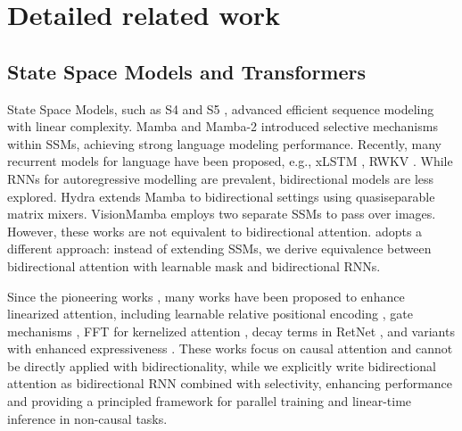 \section{Detailed related work}
\label{sec:detailrelatedwork}

\subsection{State Space Models and Transformers}

State Space Models, such as S4 \citep{gu2021efficiently} and S5 \citep{s5}, advanced efficient sequence modeling with linear complexity. 
Mamba \citep{mamba} and Mamba-2 \citep{mamba2} introduced selective mechanisms within SSMs, achieving strong language modeling performance. 
Recently, many recurrent models for language have been proposed, e.g., xLSTM \citep{xlstm}, RWKV \citep{peng2024eagle}.
While RNNs for autoregressive modelling are prevalent, bidirectional models are less explored.
Hydra \citep{hwang2024hydrabidirectionalstatespace} extends Mamba to bidirectional settings using quasiseparable matrix mixers.
VisionMamba \citep{zhu2024visionmambaefficientvisual} employs two separate SSMs to pass over images.
However, these works are not equivalent to bidirectional attention.
\lion adopts a different approach: instead of extending SSMs, we derive equivalence between bidirectional attention with learnable mask and bidirectional RNNs.

Since the pioneering works \citep{tsai2019transformer,trans_rnn}, many works have been proposed to enhance linearized attention, including learnable relative positional encoding \citep{dai2019transformer}, gate mechanisms \citep{peng2021random,han2024demystify,ma2022mega}, FFT for kernelized attention \citep{luo2021stable}, decay terms in RetNet \citep{retnet}, and variants with enhanced expressiveness \citep{arora2024simple,zhang2024hedgehogporcupineexpressive,deltanet}.
These works focus on causal attention and cannot be directly applied with bidirectionality, while we explicitly write bidirectional attention as bidirectional RNN combined with selectivity, enhancing performance and providing a principled framework for parallel training and linear-time inference in non-causal tasks.

